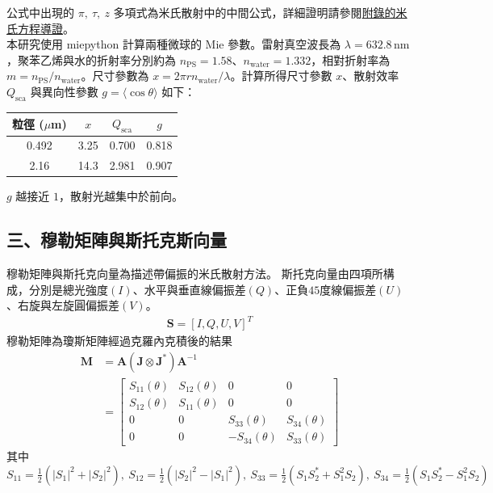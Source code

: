 公式中出現的 $\pi,\ \tau,\ z$ 多項式為米氏散射中的中間公式，詳細證明請參閱\hyperlink{subsec:mie}{附錄的米氏方程導證}。
\\
本研究使用 miepython 計算兩種微球的 Mie 參數。雷射真空波長為 $\lambda=632.8\,\mathrm{nm}$，聚苯乙烯與水的折射率分別約為 $n_{\mathrm{PS}}=1.58$、$n_{\mathrm{water}}=1.332$，相對折射率為 $m=n_{\mathrm{PS}}/n_{\mathrm{water}}$。尺寸參數為 $x=2\pi r n_{\mathrm{water}}/\lambda$。計算所得尺寸參數 $x$、散射效率 $Q_{\mathrm{sca}}$ 與異向性參數 $g=\langle\cos\theta\rangle$ 如下：
\begin{center}
\begin{tabular}{cccc}
    \toprule
    粒徑 ($\mu$m) & $x$ & $Q_{\mathrm{sca}}$ & $g$ \\
    \midrule
    0.492 & 3.25 & 0.700 & 0.818 \\
    2.16 & 14.3 & 2.981 & 0.907 \\
    \bottomrule
\end{tabular}
\end{center}
$g$ 越接近 $1$，散射光越集中於前向。

\subsection*{三、穆勒矩陣與斯托克斯向量}
穆勒矩陣與斯托克向量為描述帶偏振的米氏散射方法。
斯托克向量由四項所構成，分別是總光強度$(I)$、水平與垂直線偏振差$(Q)$、正負$45$度線偏振差$(U)$、右旋與左旋圓偏振差$(V)$。
\begin{align}
    \mathbf{S} = {\left[I, Q, U, V\right]}^T
\end{align}
穆勒矩陣為瓊斯矩陣經過克羅內克積後的結果
\begin{align}
    \mathbf{M} &= \mathbf{A} \left(\mathbf{J}\otimes\mathbf{J}^*\right) \mathbf{A}^{-1}\\
               &=\begin{bmatrix} S_{11}(\theta) & S_{12}(\theta) & 0 & 0 \\ S_{12}(\theta) & S_{11}(\theta) & 0 & 0 \\ 0 & 0 & S_{33}(\theta) & S_{34}(\theta) \\ 0 & 0 & -S_{34}(\theta) & S_{33}(\theta) \end{bmatrix}
\end{align}
其中$S_{11}=\frac{1}{2}(|S_1|^2+|S_2|^2),\ S_{12}=\frac{1}{2}(|S_2|^2-|S_1|^2),\ S_{33}=\frac{1}{2}(S_1S_2^* + S_1^2S_2),\ S_{34}=\frac{1}{2}(S_1S_2^* - S_1^2S_2)$

